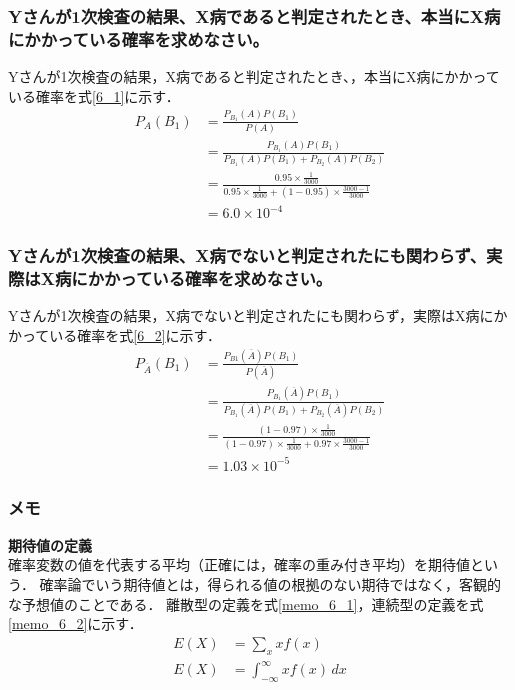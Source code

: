 \documentclass[titlepage,a4paper]{jsarticle}
\begin{document}
\subsubsection{Yさんが1次検査の結果、X病であると判定されたとき、本当にX病にかかっている確率を求めなさい。}
Yさんが1次検査の結果，X病であると判定されたとき、，本当にX病にかかっている確率を式\eqref{6_1}に示す．
\begin{align}
  P_A(B_1) & = \frac{P_{B_1}(A) P(B_1)}{P(A)}                                                                          \\
           & = \frac{P_{B_1}(A) P(B_1)}{P_{B_1}(A) P(B_1) + P_{B_2}(A) P(B_2)}                                         \\
           & = \frac{0.95 \times \frac{1}{3000}}{0.95 \times \frac{1}{3000} + (1 - 0.95) \times \frac{3000 - 1}{3000}} \\
           & = 6.0 \times 10^{-4}\label{6_1}
\end{align}

\subsubsection{Yさんが1次検査の結果、X病でないと判定されたにも関わらず、実際はX病にかかっている確率を求めなさい。}
Yさんが1次検査の結果，X病でないと判定されたにも関わらず，実際はX病にかかっている確率を式\eqref{6_2}に示す．
\begin{align}
  P_{\overline{A}}(B_1) & = \frac{P_{B1}(\overline{A}) P(B_1)}{P(\overline{A})}                                                           \\
                        & = \frac{P_{B_1}(\overline{A}) P(B_1)}{P_{B_1}(\overline{A}) P(B_1) + P_{B_2}(\overline{A}) P(B_2)}              \\
                        & = \frac{(1 - 0.97) \times \frac{1}{3000}}{(1 - 0.97) \times \frac{1}{3000} + 0.97 \times \frac{3000 - 1}{3000}} \\
                        & = 1.03 \times 10^{-5}\label{6_2}
\end{align}
\subsubsection*{メモ}
\textbf{期待値の定義}\\
確率変数の値を代表する平均（正確には，確率の重み付き平均）を期待値という．
確率論でいう期待値とは，得られる値の根拠のない期待ではなく，客観的な予想値のことである．
離散型の定義を式\eqref{memo_6_1}，連続型の定義を式\eqref{memo_6_2}に示す．
\begin{align}
  E(X) & = \sum_x x f(x) \label{memo_6_1}                      \\
  E(X) & = \int_{-\infty}^{\infty} x f(x) \,dx\label{memo_6_2}
\end{align}
\end{document}
